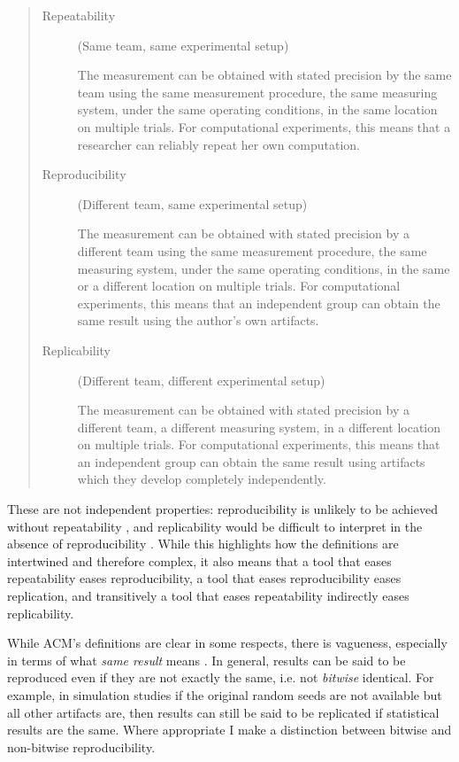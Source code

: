 \documentclass[logo,msc,dsti]{infthesis}    %
\begin{document}
\begin{quote}
\begin{description}
\item[Repeatability] (Same team, same experimental setup)

The measurement can be obtained with stated precision by the same team using the same measurement procedure, the same measuring system, under the same operating conditions, in the same location on multiple trials. For computational experiments, this means that a researcher can reliably repeat her own computation.
\item[Reproducibility] (Different team, same experimental setup)

The measurement can be obtained with stated precision by a different team using the same measurement procedure, the same measuring system, under the same operating conditions, in the same or a different location on multiple trials. For computational experiments, this means that an independent group can obtain the same result using the author’s own artifacts.

\item[Replicability] (Different team, different experimental setup)

The measurement can be obtained with stated precision by a different team, a different measuring system, in a different location on multiple trials. For computational experiments, this means that an independent group can obtain the same result using artifacts which they develop completely independently.
\end{description}
\end{quote}

These are not independent properties: reproducibility is unlikely to be achieved without repeatability \cite{hill2022reproducibility}, and replicability would be difficult to interpret in the absence of reproducibility \cite{nuijten2018verify}. While this highlights how the definitions are intertwined and therefore complex, it also means that a tool that eases repeatability eases reproducibility, a tool that eases reproducibility eases replication, and transitively a tool that eases repeatability indirectly eases replicability.

While ACM's definitions are clear in some respects, there is vagueness, especially in terms of what \emph{same result} means \cite{hill2022reproducibility}. In general, results can be said to be reproduced even if they are not exactly the same, i.e. not \emph{bitwise} identical. For example, in simulation studies if the original random seeds are not available but all other artifacts are, then results can still be said to be replicated \cite{luijken2024replicability} if statistical results are the same. Where appropriate I make a distinction between bitwise and non-bitwise reproducibility.
\end{document}
